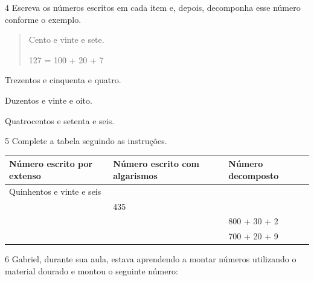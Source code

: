 \num{4} Escreva os números escritos em cada item e, depois, decomponha esse número conforme o exemplo.

\begin{quote}
Cento e vinte e sete.

127 = 100 + 20 + 7
\end{quote}


\begin{escolha}
\item Trezentos e cinquenta e quatro.


\item Duzentos e vinte e oito.


\item Quatrocentos e setenta e seis.

\end{escolha}

\num{5} Complete a tabela seguindo as instruções.

\begin{longtable}[]{@{}lll@{}}
\toprule
Número escrito por extenso & Número escrito com algarismos & Número
decomposto\tabularnewline
\midrule
\endhead
Quinhentos e vinte e seis & &\tabularnewline
& 435 &\tabularnewline
& & 800 + 30 + 2\tabularnewline
& & 700 + 20 + 9\tabularnewline
\bottomrule
\end{longtable}


\num{6} Gabriel, durante sua aula, estava aprendendo a montar números utilizando o
material dourado e montou o seguinte número:


